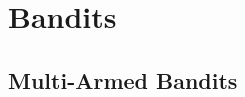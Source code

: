 \documentclass[../main/main]{subfiles}
\begin{document}
    
\chapter{Bandits}

\section{Multi-Armed Bandits}
\end{document}
